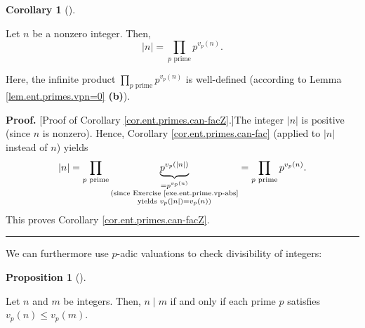 \documentclass[numbers=enddot,12pt,final,onecolumn,notitlepage]{scrartcl}%
\numberwithin{exer}{subsection}
\theoremstyle{definition}
\newtheorem{prop}[theo]{Proposition}
\newenvironment{proposition}[1][]
{\begin{prop}[#1]\begin{leftbar}}
{\end{leftbar}\end{prop}}
\newtheorem{coro}[theo]{Corollary}
\newenvironment{corollary}[1][]
{\begin{coro}[#1]\begin{leftbar}}
{\end{leftbar}\end{coro}}
\newenvironment{proof}[1][Proof]{\noindent\textbf{#1.} }{\ \rule{0.5em}{0.5em}}
\let\prodnonlimits\prod
\renewcommand{\prod}{\prodnonlimits\limits}
\begin{document}
\begin{corollary}
\label{cor.ent.primes.can-facZ}Let $n$ be a nonzero integer. Then,%
\[
\left\vert n\right\vert =\prod_{p\text{ prime}}p^{v_{p}\left(  n\right)  }.
\]


Here, the infinite product $\prod_{p\text{ prime}}p^{v_{p}\left(  n\right)  }$
is well-defined (according to Lemma \ref{lem.ent.primes.vpn=0} \textbf{(b)}).
\end{corollary}

\begin{proof}
[Proof of Corollary \ref{cor.ent.primes.can-facZ}.]The integer $\left\vert
n\right\vert $ is positive (since $n$ is nonzero). Hence, Corollary
\ref{cor.ent.primes.can-fac} (applied to $\left\vert n\right\vert $ instead of
$n$) yields%
\[
\left\vert n\right\vert =\prod_{p\text{ prime}}\underbrace{p^{v_{p}\left(
\left\vert n\right\vert \right)  }}_{\substack{=p^{v_{p}\left(  n\right)
}\\\text{(since Exercise \ref{exe.ent.prime.vp-abs}}\\\text{yields }%
v_{p}\left(  \left\vert n\right\vert \right)  =v_{p}\left(  n\right)
\text{)}}}=\prod_{p\text{ prime}}p^{v_{p}\left(  n\right)  }.
\]
This proves Corollary \ref{cor.ent.primes.can-facZ}.
\end{proof}

We can furthermore use $p$-adic valuations to check divisibility of integers:

\begin{proposition}
\label{prop.ent.primes.n|m}Let $n$ and $m$ be integers. Then, $n\mid m$ if and
only if each prime $p$ satisfies $v_{p}\left(  n\right)  \leq v_{p}\left(
m\right)  $.
\end{proposition}
\end{document}

